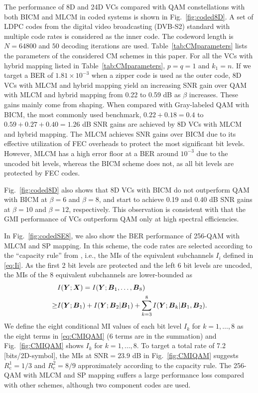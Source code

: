 \documentclass[journal]{IEEEtran}
\newcommand{\bB}{\boldsymbol{B}}
\newcommand{\bX}{\boldsymbol{X}}
\newcommand{\bY}{\boldsymbol{Y}}
\newcommand{\Rc}{R_\mathrm{c}}
\begin{document}
The performance of 8D and 24D VCs compared with QAM constellations with both BICM and MLCM in coded systems is shown in Fig.~\ref{fig:coded8D}. A set of LDPC codes from the digital video broadcasting (DVB-S2) standard \cite{dvbs2} with multiple code rates is considered as the inner code. The codeword length is $N=64800$ and $50$ decoding iterations are used. Table~\ref{tab:CMparameters} lists the parameters of the considered CM schemes in this paper. For all the VCs with hybrid mapping listed in Table~\ref{tab:CMparameters}, $p=q=1$ and $k_1=n$. If we target a BER of $1.81\times 10^{-3}$ when a zipper code \cite{sukmadji2019zipper} is used as the outer code, 8D VCs with MLCM and hybrid mapping yield an increasing SNR gain over QAM with MLCM and hybrid mapping from 0.22 to 0.59 dB as $\beta$ increases. These gains mainly come from shaping. When compared with Gray-labeled QAM with BICM, the most commonly used benchmark, $0.22+0.18=0.4$ to $0.59+0.27+0.40=1.26$ dB SNR gains are achieved by 8D VCs with MLCM and hybrid mapping. The MLCM achieves SNR gains over BICM due to its effective utilization of FEC overheads to protect the most significant bit levels. However, MLCM has a high error floor at a BER around $10^{-3}$ due to the uncoded bit levels, whereas the BICM scheme does not, as all bit levels are protected by FEC codes. 

Fig.~\ref{fig:coded8D} also shows that 8D VCs with BICM do not outperform QAM with BICM at $\beta=6$ and $\beta=8$, and start to achieve 0.19 and 0.40 dB SNR gains at $\beta=10$ and $\beta=12$, respectively. This observation is consistent with \cite[Fig. 6, Fig. 9]{ourjlt} that the GMI performance of VCs outperform QAM only at high spectral efficiencies. 

In Fig.~\ref{fig:codedSE8}, we also show the BER performance of 256-QAM with MLCM and SP mapping. In this scheme, the code rates are selected according to the ``capacity rule'' from \cite[Sec. IV-A]{wachsmann99}, i.e., the MIs of the equivalent subchannels $I_i$ defined in \eqref{eq:Ii}. As the first 2 bit levels are protected and the left 6 bit levels are uncoded, the MIs of the 8 equivalent subchannels are lower-bounded as
\begin{align}\label{eq:CMIQAM}
   &I(\bY;\bX)=I(\bY;\bB_1,\ldots,\bB_8)\notag\\
\geq&I(\bY;\bB_1)+I(\bY;\bB_2|\bB_1)+\sum_{k=3}^8I(\bY;\bB_k|\bB_1,\bB_2).
\end{align}
We define the eight conditional MI values of each bit level $I_k$ for $k=1,\ldots,8$ as the eight terms in \eqref{eq:CMIQAM} (6 terms are in the summation) and Fig.~\ref{fig:CMIQAM} shows $I_k$ for $k=1,\ldots,8$. To target a total rate of 7.2 [bits/2D-symbol], the MIs at $\text{SNR}=23.9$ dB in Fig.~\ref{fig:CMIQAM} suggests $\Rc^1=1/3$ and $\Rc^2=8/9$ approximately according to the capacity rule. The 256-QAM with MLCM and SP mapping suffers a large performance loss compared with other schemes, although two component codes are used.
\end{document}
